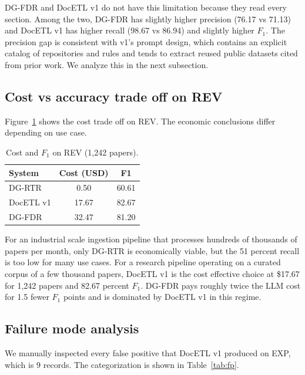 \documentclass[sigconf,nonacm]{acmart}
\begin{document}
DG-FDR and DocETL v1 do not have this limitation because they read every section. Among the two, DG-FDR has slightly higher precision (76.17 vs 71.13) and DocETL v1 has higher recall (98.67 vs 86.94) and slightly higher $F_1$. The precision gap is consistent with v1's prompt design, which contains an explicit catalog of repositories and rules and tends to extract reused public datasets cited from prior work. We analyze this in the next subsection.

\subsection{Cost vs accuracy trade off on REV}

Figure~\ref{tab:cost-rev} shows the cost trade off on REV. The economic conclusions differ depending on use case.

\begin{table}[h]
\centering
\small
\begin{tabular}{lcc}
\toprule
\textbf{System} & \textbf{Cost (USD)} & \textbf{F1} \\
\midrule
DG-RTR     & 0.50  & 60.61 \\
DocETL v1  & 17.67 & 82.67 \\
DG-FDR     & 32.47 & 81.20 \\
\bottomrule
\end{tabular}
\caption{Cost and $F_1$ on REV (1{,}242 papers).}
\label{tab:cost-rev}
\end{table}

For an industrial scale ingestion pipeline that processes hundreds of thousands of papers per month, only DG-RTR is economically viable, but the 51 percent recall is too low for many use cases. For a research pipeline operating on a curated corpus of a few thousand papers, DocETL v1 is the cost effective choice at \$17.67 for 1{,}242 papers and 82.67 percent $F_1$. DG-FDR pays roughly twice the LLM cost for 1.5 fewer $F_1$ points and is dominated by DocETL v1 in this regime.

\subsection{Failure mode analysis}

We manually inspected every false positive that DocETL v1 produced on EXP, which is 9 records. The categorization is shown in Table~\ref{tab:fp}.
\end{document}
